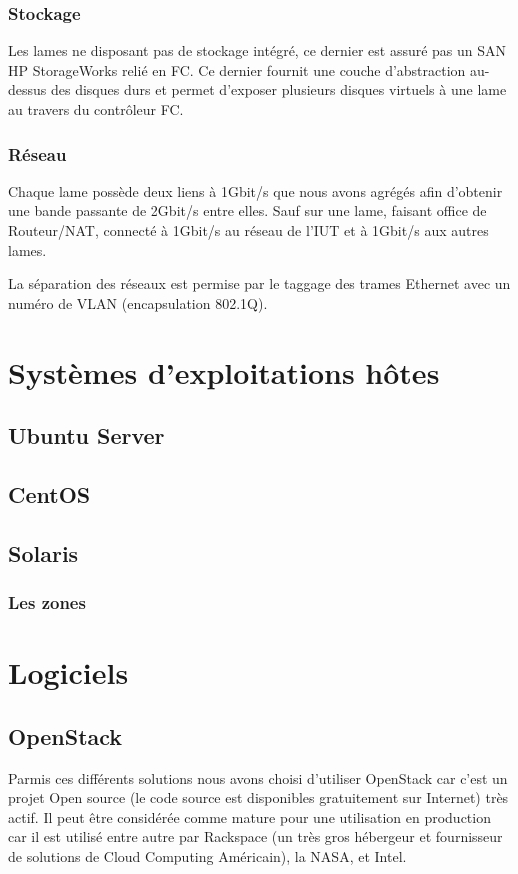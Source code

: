 \documentclass{report}
\begin{document}
\subsection{Stockage}
Les lames ne disposant pas de stockage intégré, ce dernier est assuré pas un SAN HP StorageWorks relié en FC. Ce dernier fournit une couche d'abstraction au-dessus des disques durs et permet d'exposer plusieurs disques \og virtuels \fg à une lame au travers du contrôleur FC.

\subsection{Réseau}
Chaque lame possède deux liens à 1Gbit/s que nous avons agrégés afin d'obtenir une bande passante de 2Gbit/s entre elles. Sauf sur une lame, faisant office de Routeur/NAT, connecté à 1Gbit/s au réseau de l'IUT et à 1Gbit/s aux autres lames.

La séparation des réseaux est permise par le taggage des trames Ethernet avec un numéro de VLAN (encapsulation 802.1Q).


\chapter{Systèmes d'exploitations hôtes}
\section{Ubuntu Server}

\section{CentOS}

\section{Solaris}

\subsection{Les zones}


\chapter{Logiciels}
\section{OpenStack}
Parmis ces différents solutions nous avons choisi d’utiliser OpenStack car c’est un projet Open source (le code source est disponibles gratuitement sur Internet) très actif.
Il peut être considérée comme mature pour une utilisation en production car il est utilisé entre autre par Rackspace (un très gros hébergeur et fournisseur de solutions de Cloud Computing Américain), la NASA, et Intel.
\end{document}
